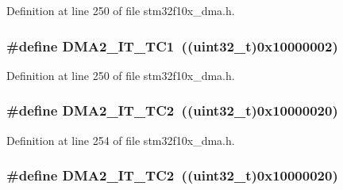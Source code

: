 Definition at line 250 of file stm32f10x\+\_\+dma.\+h.

\subsubsection[{\texorpdfstring{D\+M\+A2\+\_\+\+I\+T\+\_\+\+T\+C1}{DMA2_IT_TC1}}]{\setlength{\rightskip}{0pt plus 5cm}\#define D\+M\+A2\+\_\+\+I\+T\+\_\+\+T\+C1~(({\bf uint32\+\_\+t})0x10000002)}\hypertarget{group___d_m_a__interrupts__definition_ga2b6a86186eb56749032aa18b9baff850}{}\label{group___d_m_a__interrupts__definition_ga2b6a86186eb56749032aa18b9baff850}


Definition at line 250 of file stm32f10x\+\_\+dma.\+h.

\subsubsection[{\texorpdfstring{D\+M\+A2\+\_\+\+I\+T\+\_\+\+T\+C2}{DMA2_IT_TC2}}]{\setlength{\rightskip}{0pt plus 5cm}\#define D\+M\+A2\+\_\+\+I\+T\+\_\+\+T\+C2~(({\bf uint32\+\_\+t})0x10000020)}\hypertarget{group___d_m_a__interrupts__definition_ga174df6fdfa25046c1481ede66ff1eb6d}{}\label{group___d_m_a__interrupts__definition_ga174df6fdfa25046c1481ede66ff1eb6d}


Definition at line 254 of file stm32f10x\+\_\+dma.\+h.

\subsubsection[{\texorpdfstring{D\+M\+A2\+\_\+\+I\+T\+\_\+\+T\+C2}{DMA2_IT_TC2}}]{\setlength{\rightskip}{0pt plus 5cm}\#define D\+M\+A2\+\_\+\+I\+T\+\_\+\+T\+C2~(({\bf uint32\+\_\+t})0x10000020)}\hypertarget{group___d_m_a__interrupts__definition_ga174df6fdfa25046c1481ede66ff1eb6d}{}\label{group___d_m_a__interrupts__definition_ga174df6fdfa25046c1481ede66ff1eb6d}


